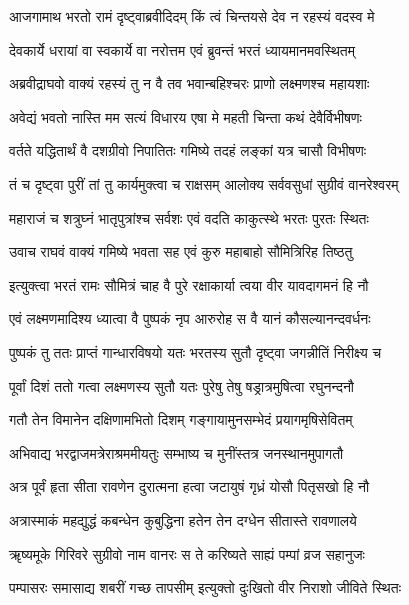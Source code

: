 \twolineshloka
{आजगामाथ भरतो रामं दृष्ट्वाब्रवीदिदम्}
{किं त्वं चिन्तयसे देव न रहस्यं वदस्व मे}%

\twolineshloka
{देवकार्ये धरायां वा स्वकार्ये वा नरोत्तम}
{एवं ब्रुवन्तं भरतं ध्यायमानमवस्थितम्}%

\twolineshloka
{अब्रवीद्राघवो वाक्यं रहस्यं तु न वै तव}
{भवान्बहिश्चरः प्राणो लक्ष्मणश्च महायशाः}%

\twolineshloka
{अवेद्यं भवतो नास्ति मम सत्यं विधारय}
{एषा मे महती चिन्ता कथं देवैर्विभीषणः}%

\twolineshloka
{वर्तते यद्धितार्थं वै दशग्रीवो निपातितः}
{गमिष्ये तदहं लङ्कां यत्र चासौ विभीषणः}%

\twolineshloka
{तं च दृष्ट्वा पुरीं तां तु कार्यमुक्त्वा च राक्षसम्}
{आलोक्य सर्ववसुधां सुग्रीवं वानरेश्वरम्}%

\twolineshloka
{महाराजं च शत्रुघ्नं भातृपुत्रांश्च सर्वशः}
{एवं वदति काकुत्स्थे भरतः पुरतः स्थितः}%

\twolineshloka
{उवाच राघवं वाक्यं गमिष्ये भवता सह}
{एवं कुरु महाबाहो सौमित्रिरिह तिष्ठतु}%

\twolineshloka
{इत्युक्त्वा भरतं रामः सौमित्रं चाह वै पुरे}
{रक्षाकार्या त्वया वीर यावदागमनं हि नौ}%

\twolineshloka
{एवं लक्ष्मणमादिश्य ध्यात्वा वै पुष्पकं नृप}
{आरुरोह स वै यानं कौसल्यानन्दवर्धनः}%

\twolineshloka
{पुष्पकं तु ततः प्राप्तं गान्धारविषयो यतः}
{भरतस्य सुतौ दृष्ट्वा जगन्नीतिं निरीक्ष्य च}%

\twolineshloka
{पूर्वां दिशं ततो गत्वा लक्ष्मणस्य सुतौ यतः}
{पुरेषु तेषु षड्रात्रमुषित्वा रघुनन्दनौ}%

\twolineshloka
{गतौ तेन विमानेन दक्षिणामभितो दिशम्}
{गङ्गायामुनसम्भेदं प्रयागमृषिसेवितम्}%

\twolineshloka
{अभिवाद्य भरद्वाजमत्रेराश्रममीयतुः}
{सम्भाष्य च मुनींस्तत्र जनस्थानमुपागतौ}%


\twolineshloka
{अत्र पूर्वं हृता सीता रावणेन दुरात्मना}
{हत्वा जटायुषं गृध्रं योसौ पितृसखो हि नौ}%

\twolineshloka
{अत्रास्माकं महद्युद्धं कबन्धेन कुबुद्धिना}
{हतेन तेन दग्धेन सीतास्ते रावणालये}%

\twolineshloka
{ॠष्यमूके गिरिवरे सुग्रीवो नाम वानरः}
{स ते करिष्यते साह्यं पम्पां व्रज सहानुजः}%

\twolineshloka
{पम्पासरः समासाद्य शबरीं गच्छ तापसीम्}
{इत्युक्तो दुःखितो वीर निराशो जीविते स्थितः}%

